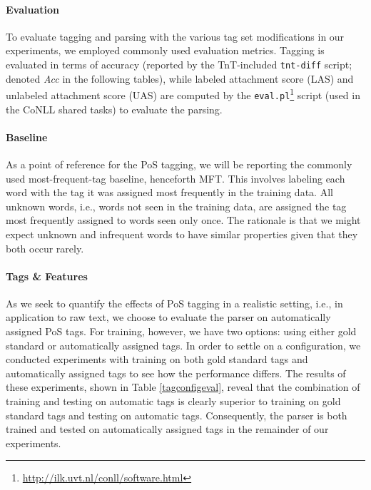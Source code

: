 \documentclass[11pt,a4paper]{article}
\begin{document}
\paragraph{Evaluation}
To evaluate tagging and parsing with the various tag set modifications in our
experiments, we employed commonly used evaluation metrics. Tagging is evaluated
in terms of accuracy (reported by the TnT-included \texttt{tnt-diff} script;
denoted \emph{Acc} in the following tables), while labeled attachment score
(LAS) and unlabeled attachment score (UAS) are computed by the
\texttt{eval.pl}\footnote{\url{http://ilk.uvt.nl/conll/software.html}} script
(used in the CoNLL shared tasks) to evaluate the parsing.

\paragraph{Baseline}
As a point of reference for the PoS tagging, we will be reporting the commonly
used most-frequent-tag baseline, henceforth MFT. This involves labeling each
word with the tag it was assigned most frequently in the training data. All
unknown words, i.e., words not seen in the training data, are assigned the tag
most frequently assigned to words seen only once. The rationale is that we
might expect unknown and infrequent words to have similar properties given that
they both occur rarely.

\paragraph{Tags \& Features} %
As we seek to quantify the effects of PoS tagging in a realistic setting, i.e.,
in application to raw text, we choose to evaluate the parser on automatically
assigned PoS tags. For training, however, we have two options: using either
gold standard or automatically assigned tags. In order to settle on a
configuration, we conducted experiments with training on both gold standard
tags and automatically assigned tags to see how the performance differs. The
results of these experiments, shown in Table \ref{tagconfigeval}, reveal that
the combination of training and testing on automatic tags is clearly superior
to training on gold standard tags and testing on automatic tags. Consequently,
the parser is both trained and tested on automatically assigned tags in the
remainder of our experiments.
\end{document}
